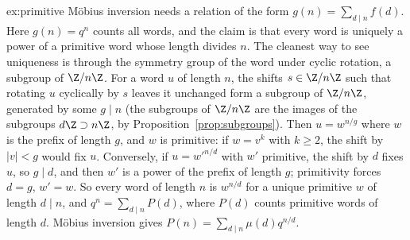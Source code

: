 \begin{solution}{ex:primitive}
\idea M\"obius inversion needs a relation of the form $g(n)=\sum_{d\mid n}f(d)$. Here $g(n)=q^n$ counts all words, and the claim is that every word is uniquely a power of a primitive word whose length divides $n$. The cleanest way to see uniqueness is through the symmetry group of the word under cyclic rotation, a subgroup of $\Z/n\Z$.
\writeup For a word $u$ of length $n$, the shifts $s\in\Z/n\Z$ such that rotating $u$ cyclically by $s$ leaves it unchanged form a subgroup of $\Z/n\Z$, generated by some $g\mid n$ (the subgroups of $\Z/n\Z$ are the images of the subgroups $d\Z\supset n\Z$, by Proposition~\ref{prop:subgroups}). Then $u=w^{n/g}$ where $w$ is the prefix of length $g$, and $w$ is primitive: if $w=v^k$ with $k\ge2$, the shift by $|v|<g$ would fix $u$.
Conversely, if $u=w'^{n/d}$ with $w'$ primitive, the shift by $d$ fixes $u$, so $g\mid d$, and then $w'$ is a power of the prefix of length $g$; primitivity forces $d=g$, $w'=w$. So every word of length $n$ is $w^{n/d}$ for a unique primitive $w$ of length $d\mid n$, and $q^n=\sum_{d\mid n}P(d)$, where $P(d)$ counts primitive words of length $d$. M\"obius inversion gives $P(n)=\sum_{d\mid n}\mu(d)q^{n/d}$.
\end{solution}

